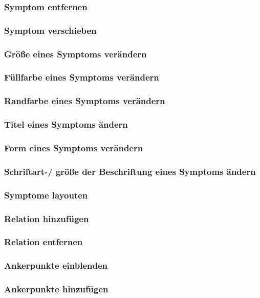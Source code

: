 \documentclass[enabledeprecatedfontcommands,fontsize=11pt,paper=a4,twoside]{scrartcl}
\begin{document}
		\subsubsection{Symptom entfernen}
		\subsubsection{Symptom verschieben}
		\subsubsection{Größe eines Symptoms verändern}
		\subsubsection{Füllfarbe eines Symptoms verändern}
		\subsubsection{Randfarbe eines Symptoms verändern}
		\subsubsection{Titel eines Symptoms ändern}
		\subsubsection{Form eines Symptoms verändern}
		\subsubsection{Schriftart-/ größe der Beschriftung eines Symptoms ändern}
		\subsubsection{Symptome layouten}
			
		\subsubsection{Relation hinzufügen}
		\subsubsection{Relation entfernen}
		\subsubsection{Ankerpunkte einblenden}
		\subsubsection{Ankerpunkte hinzufügen}
\end{document}
